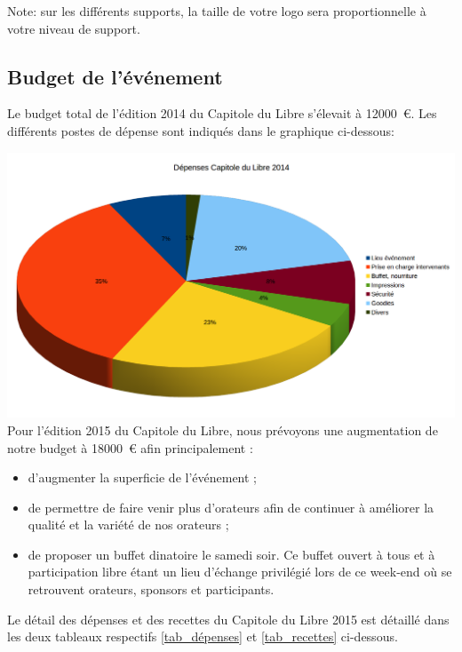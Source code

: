 Note: sur les différents supports, la taille de votre logo sera proportionnelle à votre niveau de support.

	\subsection{Budget de l’événement}

Le budget total de l'édition 2014 du Capitole du Libre s'élevait à \SI{12000}{\euro}. Les différents postes de dépense sont indiqués dans le graphique ci-dessous:

\includegraphics[scale=0.6]{Images/budget_2014.png}\\

Pour l'édition 2015 du Capitole du Libre, nous prévoyons une augmentation de notre budget à \SI{18000}{\euro} afin principalement :
\begin{itemize}[label=$\bullet$]
\item d'augmenter la superficie de l'événement ;
\item de permettre de faire venir plus d'orateurs afin de continuer à améliorer la qualité et la variété de nos orateurs ;
\item de proposer un buffet dinatoire le samedi soir. Ce buffet ouvert à tous et à participation libre étant un lieu d'échange privilégié lors de ce week-end où se retrouvent orateurs, sponsors et participants.
\end{itemize}

\Separateur

Le détail des dépenses et des recettes du Capitole du Libre 2015 est détaillé dans les deux tableaux respectifs \ref{tab_dépenses} et \ref{tab_recettes} ci-dessous.

